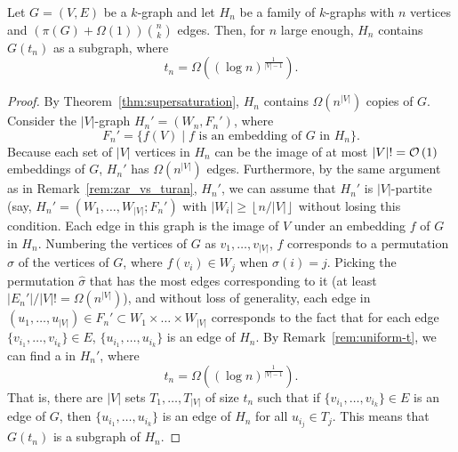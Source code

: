 \begin{theorem} \label{thm:quant-blowup}
    Let $G = (V, E)$ be a $k$-graph and let $H_n$ be a family of $k$-graphs with $n$
    vertices and $\left( \pi(G) + \Omega (1) \right) \binom{n}{k}$ edges. %
    Then, for $n$ large enough, $H_n$ contains $G(t_n)$ as a subgraph,
    where
    \[
        t_n = \Omega\left( (\log n)^{\frac{1}{|V|-1}} \right).
    \]
    \begin{proof}
        By Theorem~\ref{thm:supersaturation}, $H_n$ contains $\Omega\left( n^{|V|} \right)$ copies of $G$.
        Consider the $|V|$-graph $H_n' = (W_n, F_n')$, where
        \[
            F_n' = \{f(V) \mid f \text{ is an embedding of } G \text{ in } H_n\}.
        \]
        Because each set of $|V|$ vertices in $H_n$ can be the image of at most $|V|! = \mathcal{O}\left(1\right)$ embeddings of $G$,
        $H_n'$ has $\Omega\left(n^{|V|} \right)$ edges.
        Furthermore, by the same argument as in Remark~\ref{rem:zar_vs_turan}, $H_n'$, we can assume that
        $H_n'$ is $|V|$-partite (say, $H_n' = (W_1, \dots, W_{|V|}; F_n')$ with
        $|W_i| \geq \left\lfloor n / |V| \right\rfloor$
        without losing this condition.
        Each edge in this graph is the image of $V$ under an embedding $f$ of $G$ in $H_n$.
        Numbering the vertices of $G$ as $v_1, \dots, v_{|V|}$, $f$ corresponds to a permutation $\sigma$
        of the vertices of $G$, where $f(v_i) \in W_j$ when $\sigma(i) = j$.
        Picking the permutation $\hat{\sigma}$ that has the most edges corresponding to it
        (at least $|E_n'| / |V|! = \Omega\left( n^{|V|} \right)$), and without loss of generality,
        each edge in $(u_1, \dots, u_{|V|}) \in F_n' \subset W_1 \times \dots \times W_{|V|}$
        corresponds to the fact that for each edge $\{v_{i_1}, \dots, v_{i_k}\} \in E$,
        $\{u_{i_1}, \dots ,u_{i_k}\}$ is an edge of $H_n$.
        By Remark~\ref{rem:uniform-t}, we can find a  in $H_n'$,
        where
        \[
            t_n = \Omega\left( (\log n)^{\frac{1}{|V|-1}} \right).
        \]
        That is, there are $|V|$ sets $T_1, \dots, T_{|V|}$ of size $t_n$ such that
        if $\{v_{i_1}, \dots, v_{i_k}\} \in E$ is an edge of $G$, then
        $\{u_{i_1}, \dots, u_{i_k}\}$ is an edge of $H_n$ for all $u_{i_j} \in T_j$.
        This means that $G(t_n)$ is a subgraph of $H_n$.

    \end{proof}
\end{theorem}

